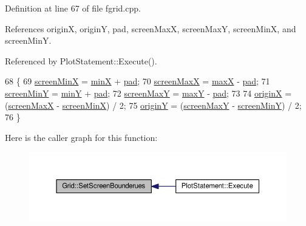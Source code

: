 Definition at line 67 of file fgrid.\+cpp.



References originX, originY, pad, screen\+MaxX, screen\+MaxY, screen\+MinX, and screen\+MinY.



Referenced by Plot\+Statement\+::\+Execute().


\begin{DoxyCode}
68 \{
69     \hyperlink{classGrid_a5876a8eaa41c1ac49fec464475d7cbb6}{screenMinX} = \hyperlink{classGrid_a70c775fad6a2cfa910a7e1f8c5b3e9b2}{minX} + \hyperlink{classGrid_a2bf4a157b130ed18d78d2e9a6760a6a8}{pad};
70     \hyperlink{classGrid_ad662ef34930a80011080a45a975cae79}{screenMaxX} = \hyperlink{classGrid_ad093fee95a663d4b82c85bea9a1241ec}{maxX} - \hyperlink{classGrid_a2bf4a157b130ed18d78d2e9a6760a6a8}{pad};
71     \hyperlink{classGrid_a18e1493a917be10c5454f44e1114fbdc}{screenMinY} = \hyperlink{classGrid_af592907852d983fe13ef9581ffd77e6b}{minY} + \hyperlink{classGrid_a2bf4a157b130ed18d78d2e9a6760a6a8}{pad};
72     \hyperlink{classGrid_a9ff802b20cf95e066646d24aa284a547}{screenMaxY} = \hyperlink{classGrid_acca4c514021d9f6733579b699ac68436}{maxY} - \hyperlink{classGrid_a2bf4a157b130ed18d78d2e9a6760a6a8}{pad};
73 
74     \hyperlink{classGrid_a0c0e10fa32d7fa78985cba0df1a34a0f}{originX} = (\hyperlink{classGrid_ad662ef34930a80011080a45a975cae79}{screenMaxX} - \hyperlink{classGrid_a5876a8eaa41c1ac49fec464475d7cbb6}{screenMinX}) / 2;
75     \hyperlink{classGrid_add0854295a7e36ab9f77889862bfda0e}{originY} = (\hyperlink{classGrid_a9ff802b20cf95e066646d24aa284a547}{screenMaxY} - \hyperlink{classGrid_a18e1493a917be10c5454f44e1114fbdc}{screenMinY}) / 2;
76 \}
\end{DoxyCode}


Here is the caller graph for this function\+:\nopagebreak
\begin{figure}[H]
\begin{center}
\leavevmode
\includegraphics[width=350pt]{classGrid_ac5386f4f62d3aae6a518fa11d25c7e59_icgraph}
\end{center}
\end{figure}




